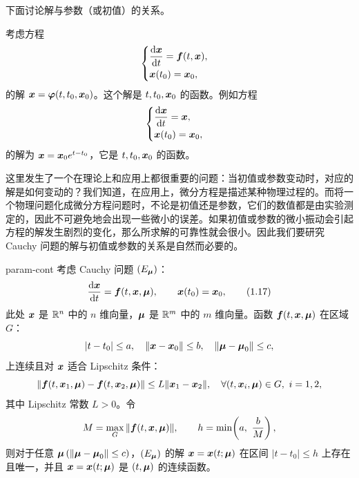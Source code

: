 

下面讨论解与参数（或初值）的关系。

考虑方程
\[
	\begin{cases}
		\dfrac{\mathrm{d} \boldsymbol{x}}{\mathrm{d} t} = \boldsymbol{f}(t, \boldsymbol{x}), \\[4pt]
		\boldsymbol{x}(t_0) = \boldsymbol{x}_0,
	\end{cases}
\]
的解 $\boldsymbol{x} = \boldsymbol{\varphi}(t, t_0, \boldsymbol{x}_0)$。这个解是 $t, t_0, \boldsymbol{x}_0$ 的函数。例如方程
\[
	\begin{cases}
		\dfrac{\mathrm{d} \boldsymbol{x}}{\mathrm{d} t} = \boldsymbol{x}, \\[4pt]
		\boldsymbol{x}(t_0) = \boldsymbol{x}_0,
	\end{cases}
\]
的解为 $\boldsymbol{x} = \boldsymbol{x}_0 e^{t - t_0}$，它是 $t, t_0, \boldsymbol{x}_0$ 的函数。

这里发生了一个在理论上和应用上都很重要的问题：当初值或参数变动时，对应的解是如何变动的？我们知道，在应用上，微分方程是描述某种物理过程的。而将一个物理问题化成微分方程问题时，不论是初值还是参数，它们的数值都是由实验测定的，因此不可避免地会出现一些微小的误差。如果初值或参数的微小振动会引起方程的解发生剧烈的变化，那么所求解的可靠性就会很小。因此我们要研究 Cauchy 问题的解与初值或参数的关系是自然而必要的。

\begin{theorem}{}{param-cont}
	考虑 Cauchy 问题 $(E_{\boldsymbol{\mu}})$：
	\[
		\frac{\mathrm{d} \boldsymbol{x}}{\mathrm{d} t} = \boldsymbol{f}(t, \boldsymbol{x}, \boldsymbol{\mu}), \qquad 
		\boldsymbol{x}(t_0) = \boldsymbol{x}_0,
		\tag{1.17}
	\]
	此处 $\boldsymbol{x}$ 是 $\mathbb{R}^n$ 中的 $n$ 维向量，$\boldsymbol{\mu}$ 是 $\mathbb{R}^m$ 中的 $m$ 维向量。函数 $\boldsymbol{f}(t, \boldsymbol{x}, \boldsymbol{\mu})$ 在区域 $G$：
	\[
		|t - t_0| \leq a,\quad \|\boldsymbol{x} - \boldsymbol{x}_0\| \leq b,\quad \|\boldsymbol{\mu} - \boldsymbol{\mu}_0\| \leq c,
	\]
	上连续且对 $\boldsymbol{x}$ 适合 Lipschitz 条件：
	\[
		\|\boldsymbol{f}(t, \boldsymbol{x}_1, \boldsymbol{\mu}) - \boldsymbol{f}(t, \boldsymbol{x}_2, \boldsymbol{\mu})\| 
		\leq L\|\boldsymbol{x}_1 - \boldsymbol{x}_2\|, \quad \forall(t, \boldsymbol{x}_i, \boldsymbol{\mu}) \in G,\ i = 1,2,
	\]
	其中 Lipschitz 常数 $L > 0$。令
	\[
		M = \max_G \|\boldsymbol{f}(t, \boldsymbol{x}, \boldsymbol{\mu})\|, \qquad 
		h = \min\!\left(a,\ \frac{b}{M}\right),
	\]
	则对于任意 $\boldsymbol{\mu}\,(\|\boldsymbol{\mu} - \boldsymbol{\mu}_0\| \leq c)$，$(E_{\boldsymbol{\mu}})$ 的解 $\boldsymbol{x} = \boldsymbol{x}(t; \boldsymbol{\mu})$ 在区间 $|t - t_0| \leq h$ 上存在且唯一，并且 $\boldsymbol{x} = \boldsymbol{x}(t; \boldsymbol{\mu})$ 是 $(t, \boldsymbol{\mu})$ 的连续函数。
\end{theorem}

